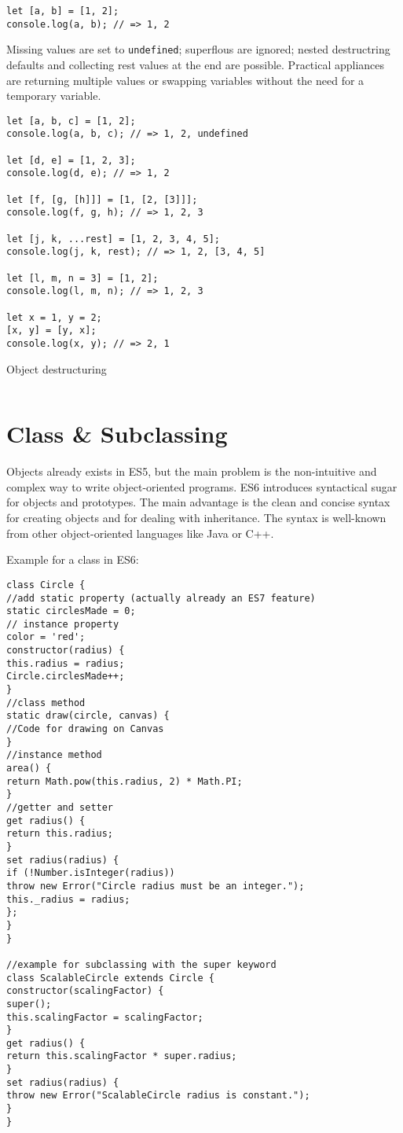 \documentclass{bioinfo}
\begin{document}
\begin{lstlisting}
let [a, b] = [1, 2];
console.log(a, b); // => 1, 2
\end{lstlisting}

Missing values are set to {\tt undefined}; superflous are ignored; nested destructring
defaults and collecting rest values at the end are possible.
Practical appliances are returning multiple values or swapping variables
without the need for a temporary variable.

\begin{lstlisting}
let [a, b, c] = [1, 2];
console.log(a, b, c); // => 1, 2, undefined

let [d, e] = [1, 2, 3];
console.log(d, e); // => 1, 2

let [f, [g, [h]]] = [1, [2, [3]]];
console.log(f, g, h); // => 1, 2, 3

let [j, k, ...rest] = [1, 2, 3, 4, 5];
console.log(j, k, rest); // => 1, 2, [3, 4, 5]

let [l, m, n = 3] = [1, 2];
console.log(l, m, n); // => 1, 2, 3

let x = 1, y = 2;
[x, y] = [y, x];
console.log(x, y); // => 2, 1
\end{lstlisting}

Object destructuring
\begin{lstlisting}

\end{lstlisting}

\section{Class \& Subclassing}
Objects already exists in ES5, but the main problem is the non-intuitive and complex
way to write object-oriented programs. ES6 introduces syntactical sugar for objects
and prototypes. The main advantage is the clean and concise syntax for creating
objects and for dealing with inheritance. The syntax is well-known from other
object-oriented languages like Java or C++.

 Example for a class in ES6:
\begin{lstlisting}
class Circle {
//add static property (actually already an ES7 feature)
static circlesMade = 0;
// instance property
color = 'red';
constructor(radius) {
this.radius = radius;
Circle.circlesMade++;
}
//class method
static draw(circle, canvas) {
//Code for drawing on Canvas
}
//instance method
area() {
return Math.pow(this.radius, 2) * Math.PI;
}
//getter and setter
get radius() {
return this.radius;
}
set radius(radius) {
if (!Number.isInteger(radius))
throw new Error("Circle radius must be an integer.");
this._radius = radius;
};
}
}

//example for subclassing with the super keyword
class ScalableCircle extends Circle {
constructor(scalingFactor) {
super();
this.scalingFactor = scalingFactor;
}
get radius() {
return this.scalingFactor * super.radius;
}
set radius(radius) {
throw new Error("ScalableCircle radius is constant.");
}
}
\end{lstlisting}
\end{document}

